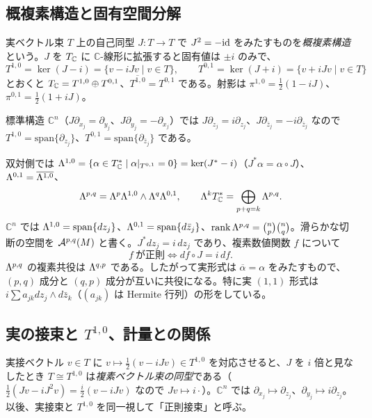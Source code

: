 \subsection{概複素構造と固有空間分解}
\begin{defn}[概複素構造]
実ベクトル束 $T$ 上の自己同型 $J:T\to T$ で $J^2=-\mathrm{id}$ をみたすものを\emph{概複素構造}という。$J$ を $T_{\mathbb C}$ に $\mathbb C$-線形に拡張すると固有値は $\pm i$ のみで、
\[
T^{1,0}=\ker(J-i)=\{v-iJv\mid v\in T\},\qquad T^{0,1}=\ker(J+i)=\{v+iJv\mid v\in T\}
\]
とおくと $T_{\mathbb C}=T^{1,0}\oplus T^{0,1}$、$\overline{T^{1,0}}=T^{0,1}$ である。射影は $\pi^{1,0}=\tfrac12(1-iJ)$、$\pi^{0,1}=\tfrac12(1+iJ)$。
\end{defn}
標準構造 $\mathbb C^n$（$J\partial_{x_j}=\partial_{y_j}$、$J\partial_{y_j}=-\partial_{x_j}$）では $J\partial_{z_j}=i\partial_{z_j}$、$J\partial_{\bar z_j}=-i\partial_{\bar z_j}$ なので $T^{1,0}=\mathrm{span}\{\partial_{z_j}\}$、$T^{0,1}=\mathrm{span}\{\partial_{\bar z_j}\}$ である。

双対側では $\Lambda^{1,0}=\{\alpha\in T_{\mathbb C}^*\mid\alpha|_{T^{0,1}}=0\}=\ker(J^*-i)$（$J^*\alpha=\alpha\circ J$）、$\Lambda^{0,1}=\overline{\Lambda^{1,0}}$、
\[
\Lambda^{p,q}=\Lambda^p\Lambda^{1,0}\wedge\Lambda^q\Lambda^{0,1},\qquad \Lambda^kT_{\mathbb C}^*=\bigoplus_{p+q=k}\Lambda^{p,q}.
\]
$\mathbb C^n$ では $\Lambda^{1,0}=\mathrm{span}\{dz_j\}$、$\Lambda^{0,1}=\mathrm{span}\{d\bar z_j\}$、$\operatorname{rank}\Lambda^{p,q}=\binom np\binom nq$。滑らかな切断の空間を $\mathcal A^{p,q}(M)$ と書く。$J^*dz_j=i\,dz_j$ であり、複素数値関数 $f$ について
\begin{equation}\label{eq:holiffJ}
f\ \text{が正則}\iff df\circ J=i\,df .
\end{equation}
$\Lambda^{p,q}$ の複素共役は $\Lambda^{q,p}$ である。したがって実形式は $\overline\alpha=\alpha$ をみたすもので、$(p,q)$ 成分と $(q,p)$ 成分が互いに共役になる。特に実 $(1,1)$ 形式は $i\sum a_{jk}dz_j\wedge d\bar z_k$（$(a_{jk})$ は Hermite 行列）の形をしている。


\subsection{実の接束と $T^{1,0}$、計量との関係}
実接ベクトル $v\in T$ に $v\mapsto\frac12(v-iJv)\in T^{1,0}$ を対応させると、$J$ を $i$ 倍と見なしたとき $T\cong T^{1,0}$ は\emph{複素ベクトル束の同型}である（$\frac12(Jv-iJ^2v)=\frac i2(v-iJv)$ なので $Jv\mapsto i\cdot$）。$\mathbb C^n$ では $\partial_{x_j}\mapsto\partial_{z_j}$、$\partial_{y_j}\mapsto i\partial_{z_j}$。以後、実接束と $T^{1,0}$ を同一視して「正則接束」と呼ぶ。


